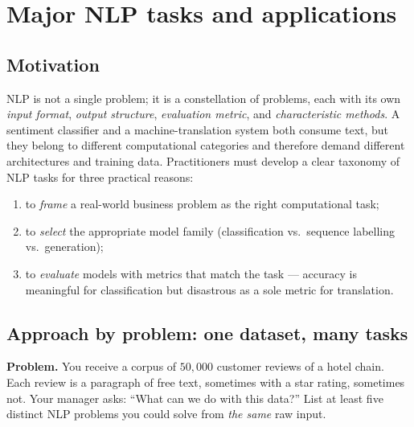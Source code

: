 \section{Major NLP tasks and applications}

\subsection{Motivation}
NLP is not a single problem; it is a constellation of problems, each with its own \emph{input format}, \emph{output structure}, \emph{evaluation metric}, and \emph{characteristic methods}. A sentiment classifier and a machine-translation system both consume text, but they belong to different computational categories and therefore demand different architectures and training data. Practitioners must develop a clear taxonomy of NLP tasks for three practical reasons:
\begin{enumerate}
    \item to \emph{frame} a real-world business problem as the right computational task;
    \item to \emph{select} the appropriate model family (classification vs.\ sequence labelling vs.\ generation);
    \item to \emph{evaluate} models with metrics that match the task --- accuracy is meaningful for classification but disastrous as a sole metric for translation.
\end{enumerate}

\subsection{Approach by problem: one dataset, many tasks}
\textbf{Problem.} You receive a corpus of $50{,}000$ customer reviews of a hotel chain. Each review is a paragraph of free text, sometimes with a star rating, sometimes not. Your manager asks: ``What can we do with this data?'' List at least five distinct NLP problems you could solve from \emph{the same} raw input.

